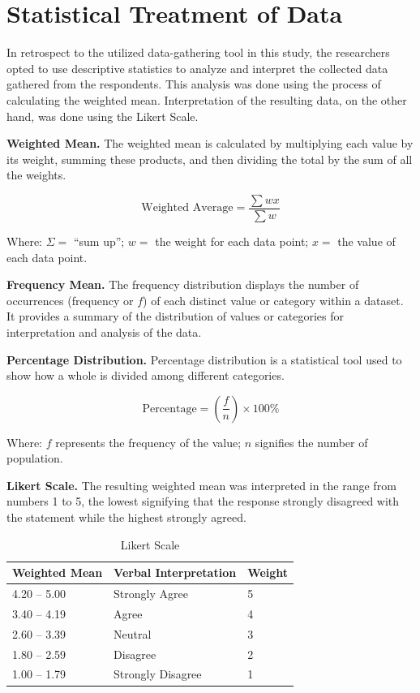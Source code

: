 \documentclass{research}
\begin{document}
\section{Statistical Treatment of Data}

In retrospect to the utilized data-gathering tool in this study, the researchers opted
to use descriptive statistics to analyze and interpret the collected data gathered from
the respondents. This analysis was done using the process of calculating the weighted
mean. Interpretation of the resulting data, on the other hand, was done using the
Likert Scale.

\textbf{Weighted Mean.} The weighted mean is calculated by multiplying each value by
its weight, summing these products, and then dividing the total by the sum of all the
weights.

\[
\text{Weighted Average} = \frac{\sum wx}{\sum w}
\]

Where: $\Sigma =$ ``sum up''; $w =$ the weight for each data point;
$x =$ the value of each data point.

\textbf{Frequency Mean.} The frequency distribution displays the number of occurrences
(frequency or $f$) of each distinct value or category within a dataset. It provides a
summary of the distribution of values or categories for interpretation and analysis of
the data.

\textbf{Percentage Distribution.} Percentage distribution is a statistical tool used
to show how a whole is divided among different categories.

\[
\text{Percentage} = \left(\frac{f}{n}\right) \times 100\%
\]

Where: $f$ represents the frequency of the value; $n$ signifies the number of
population.

\textbf{Likert Scale.} The resulting weighted mean was interpreted in the range from
numbers 1 to 5, the lowest signifying that the response strongly disagreed with the
statement while the highest strongly agreed.

\begin{table}[h!]
\centering
\caption{Likert Scale}
\label{tab:likert}
\begin{tabular}{lll}
\toprule
\textbf{Weighted Mean} & \textbf{Verbal Interpretation} & \textbf{Weight} \\
\midrule
4.20 -- 5.00 & Strongly Agree    & 5 \\
3.40 -- 4.19 & Agree             & 4 \\
2.60 -- 3.39 & Neutral           & 3 \\
1.80 -- 2.59 & Disagree          & 2 \\
1.00 -- 1.79 & Strongly Disagree & 1 \\
\bottomrule
\end{tabular}
\end{table}
\end{document}
